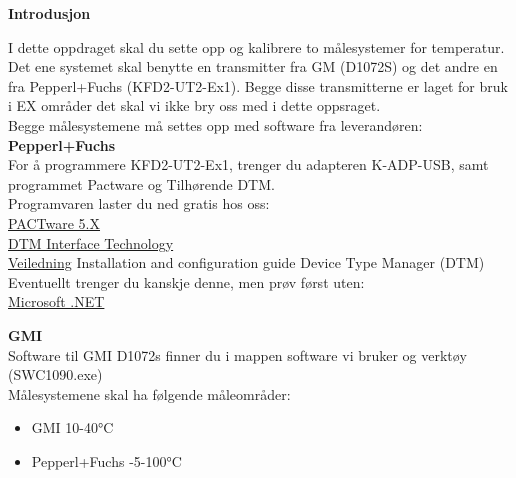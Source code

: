 

\noindent

\vskip 5pt


\textbf{Introdusjon}

\vskip 5pt 
I dette oppdraget skal du sette opp og kalibrere to målesystemer for temperatur. Det ene systemet skal benytte en transmitter fra GM (D1072S) og det andre en fra Pepperl+Fuchs (KFD2-UT2-Ex1). Begge disse transmitterne er laget for bruk i EX områder det skal vi ikke bry oss med i dette oppsraget. 
\\
Begge målesystemene må settes opp med software fra leverandøren:
\\
\textbf{Pepperl+Fuchs}
\\
For å programmere KFD2-UT2-Ex1, trenger du adapteren K-ADP-USB, samt programmet Pactware og Tilhørende DTM.
\\

Programvaren laster du ned gratis hos oss:
\\
\href {https://www.pepperl-fuchs.com/norway/no/classid_163.htm?view=productdetails&prodid=83574#software}{PACTware 5.X}
\\
\href {https://www.pepperl-fuchs.com/norway/no/classid_1804.htm?view=productdetails&prodid=32802}{DTM Interface Technology}
\\
 

\href{https://files.pepperl-fuchs.com/webcat/navi/productInfo/doct/tdoct1599c_eng.pdf?v=20200320004907}{Veiledning} Installation and configuration guide Device Type Manager (DTM)
\\  
Eventuellt trenger du kanskje denne, men prøv først uten:
\\
\href {https://www.pepperl-fuchs.com/norway/no/classid_1805.htm?view=productdetails&prodid=27434}{Microsoft .NET}


\vskip 5pt 

\textbf{GMI}
\\
Software til GMI D1072s finner du i mappen software vi bruker og verktøy (SWC1090.exe)
\\
Målesystemene skal ha følgende måleområder:
\begin{itemize}[noitemsep]
\item GMI 10-40°C
\item Pepperl+Fuchs -5-100°C
\end{itemize}

